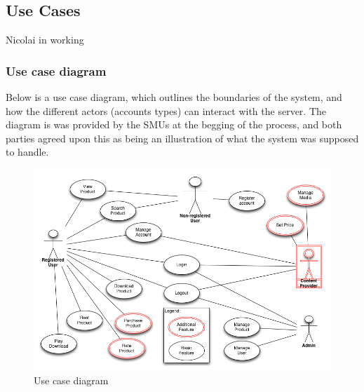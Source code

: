 \subsection{Use Cases}

Nicolai in working

\subsubsection{Use case diagram}
Below is a use case diagram, which outlines the boundaries of the system, and how the different actors (accounts types) can interact with the server.
The diagram is was provided by the SMUs at the begging of the process, and both parties agreed upon this as being an illustration of what the system was supposed to handle.
\begin{figure}[ht!]
\centering
\includegraphics[width=160mm]{texts/Client/UseCase.png}
\caption{Use case diagram}
\label{useCaseImg}
\end{figure}

\newpage